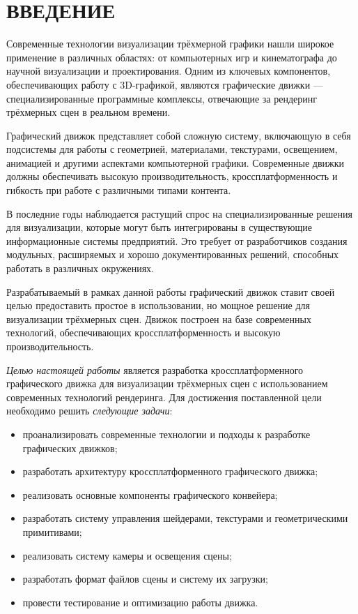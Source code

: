 \section*{ВВЕДЕНИЕ}

Современные технологии визуализации трёхмерной графики нашли широкое применение в различных областях: от компьютерных игр и кинематографа до научной визуализации и проектирования. Одним из ключевых компонентов, обеспечивающих работу с 3D-графикой, являются графические движки — специализированные программные комплексы, отвечающие за рендеринг трёхмерных сцен в реальном времени.

Графический движок представляет собой сложную систему, включающую в себя подсистемы для работы с геометрией, материалами, текстурами, освещением, анимацией и другими аспектами компьютерной графики. Современные движки должны обеспечивать высокую производительность, кроссплатформенность и гибкость при работе с различными типами контента.

В последние годы наблюдается растущий спрос на специализированные решения для визуализации, которые могут быть интегрированы в существующие информационные системы предприятий. Это требует от разработчиков создания модульных, расширяемых и хорошо документированных решений, способных работать в различных окружениях.

Разрабатываемый в рамках данной работы графический движок ставит своей целью предоставить простое в использовании, но мощное решение для визуализации трёхмерных сцен. Движок построен на базе современных технологий, обеспечивающих кроссплатформенность и высокую производительность.

\emph{Целью настоящей работы} является разработка кроссплатформенного графического движка для визуализации трёхмерных сцен с использованием современных технологий рендеринга. Для достижения поставленной цели необходимо решить \emph{следующие задачи}:
\begin{itemize}
\item проанализировать современные технологии и подходы к разработке графических движков;
\item разработать архитектуру кроссплатформенного графического движка;
\item реализовать основные компоненты графического конвейера;
\item разработать систему управления шейдерами, текстурами и геометрическими примитивами;
\item реализовать систему камеры и освещения сцены;
\item разработать формат файлов сцены и систему их загрузки;
\item провести тестирование и оптимизацию работы движка.
\end{itemize}

